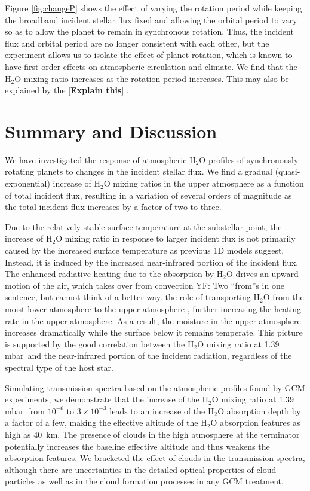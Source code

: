 \documentclass[11pt,numberedappendix,twocolappendix,]{emulateapj}
\def\water{H$_2$O }
\def\preslevel{1.39 mbar\ }
\def\memo#1{\color{red}$[${\bf #1}$]$ \color{black}}
\newcommand{\yf}[1]{{\color{orange}#1}}
\begin{document}
Figure \ref{fig:changeP}  shows the effect of varying the rotation period while keeping the broadband incident stellar flux fixed and allowing the orbital period to vary so as to allow the planet to remain in synchronous rotation.  Thus, the incident flux and orbital period are no longer consistent with each other, but the experiment allows us to isolate the effect of planet rotation, which is known to have first order effects on atmospheric circulation and climate.
We find that the \water mixing ratio increases as the rotation period increases. 
This may also be explained by the 
\memo{Explain this}. 



\section{Summary and Discussion}
\label{s:summary}

We have investigated the response of atmospheric \water profiles of synchronously rotating planets to changes in the incident stellar flux. 
We find a gradual (quasi-exponential) increase of \water mixing ratios in the upper atmosphere as a function of total incident flux, resulting in a variation of several orders of magnitude as the total incident flux increases by a factor of two to three. 

Due to the relatively stable surface temperature at the substellar point, the increase of \water mixing ratio in response to larger incident flux is not primarily caused by the increased surface temperature as previous 1D models suggest. 
Instead, it is induced by the increased near-infrared portion of the incident flux. 
The enhanced radiative heating due to the absorption by \water drives an upward motion of the air, which takes over from convection \yf{YF: Two ``from''s in one sentence, but cannot think of a better way.} the role of transporting \water from the moist lower atmosphere to the upper atmosphere , further increasing the heating rate in the upper atmosphere.
As a result, the moisture in the upper atmosphere increases dramatically while the surface below it remains temperate. 
This picture is supported by the good correlation between the \water mixing ratio at \preslevel and the near-infrared portion of the incident radiation, regardless of the spectral type of the host star. 

Simulating transmission spectra based on the atmospheric profiles found by GCM experiments, 
we demonstrate that the increase of the \water mixing ratio at \preslevel from $10^{-6}$ to $3 \times 10^{-3}$ leads to an increase of the \water absorption depth by a factor of a few, making the effective altitude of the \water absorption features as high as 40~km. 
The presence of clouds in the high atmosphere at the terminator potentially increases the baseline effective altitude and thus weakens the absorption features. 
We bracketed the effect of clouds in the transmission spectra, 
although there are uncertainties in the detailed optical properties of cloud particles as well as in the cloud formation processes in any GCM treatment. 
\end{document}

